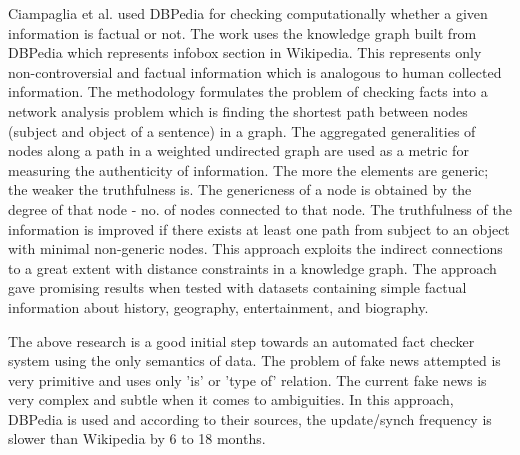 \documentclass[a4paper, 11pt]{article}
\begin{document}
Ciampaglia et al. \cite{Ciampaglia2015} used DBPedia for checking computationally whether a given information is factual or not. The work uses the knowledge graph built from DBPedia which represents infobox section in Wikipedia. This represents only non-controversial and factual information which is analogous to human collected information. The methodology formulates the problem of checking facts into a network analysis problem which is finding the shortest path between nodes (subject and object of a sentence) in a graph. The aggregated generalities of nodes along a path in a weighted undirected graph are used as a metric for measuring the authenticity of information. The more the elements are generic; the weaker the truthfulness is.  The genericness of a node is obtained by the degree of that node - no. of nodes connected to that node. The truthfulness of the information is improved if there exists at least one path from subject to an object with minimal non-generic nodes. This approach exploits the indirect connections to a great extent with distance constraints in a knowledge graph. The approach gave promising results when tested with datasets containing simple factual information about history, geography, entertainment, and biography. 

The above research is a good initial step towards an automated fact checker system using the only semantics of data. The problem of fake news attempted is very primitive and uses only 'is' or 'type of' relation. The current fake news is very complex and subtle when it comes to ambiguities. In this approach, DBPedia is used and according to their sources, the update/synch frequency is slower than Wikipedia by 6 to 18 months.






\end{document}
